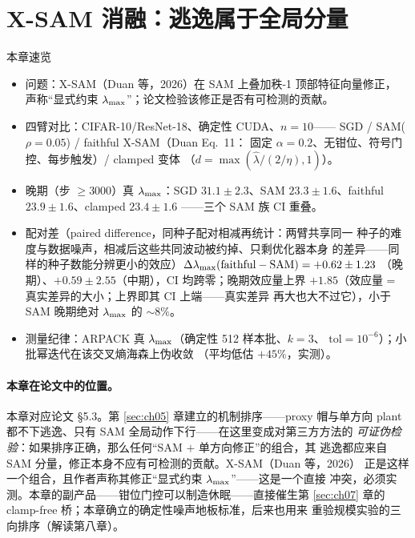 
\section{X-SAM 消融：逃逸属于全局分量}
\label{sec:ch06}

\begin{keybox}{本章速览}
\begin{itemize}
  \item 问题：X-SAM（Duan 等，2026）在 SAM 上叠加秩-1 顶部特征向量修正，
        声称``显式约束 $\lambda_{\max}$''；论文检验该修正是否有可检测的贡献。
  \item 四臂对比：CIFAR-10/ResNet-18、确定性 CUDA、$n{=}10$——
        SGD / SAM($\rho{=}0.05$) / faithful X-SAM（Duan Eq.~11：
        固定 $\alpha{=}0.2$、无钳位、符号门控、每步触发）/ clamped 变体
        （$d=\max(\hat\lambda/(2/\eta),1)$）。
  \item 晚期（步 $\geq3000$）真 $\lambda_{\max}$：SGD $31.1\pm2.3$、SAM
        $23.3\pm1.6$、faithful $23.9\pm1.6$、clamped $23.4\pm1.6$
        ——三个 SAM 族 CI 重叠。
  \item 配对差（paired difference，同种子配对相减再统计：两臂共享同一
        种子的难度与数据噪声，相减后这些共同波动被约掉、只剩优化器本身
        的差异——同样的种子数能分辨更小的效应）$\Delta\lambda_{\max}(\text{faithful}-\text{SAM})=+0.62\pm1.23$
        （晚期）、$+0.59\pm2.55$（中期），CI 均跨零；晚期效应量上界
        $+1.85$（效应量 = 真实差异的大小；上界即其 CI 上端——真实差异
        再大也大不过它），小于 SAM 晚期绝对 $\lambda_{\max}$ 的 $\sim8\%$。
  \item 测量纪律：ARPACK 真 $\lambda_{\max}$（确定性 512 样本批、$k{=}3$、
        $\mathrm{tol}{=}10^{-6}$）；小批幂迭代在该交叉熵海森上伪收敛
        （平均低估 $+45\%$，实测）。
\end{itemize}
\end{keybox}

\paragraph{本章在论文中的位置。}
本章对应论文 §5.3。第 \ref{sec:ch05} 章建立的机制排序——proxy 帽与单方向
plant 都不下逃逸、只有 SAM 全局动作下行——在这里变成对第三方方法的
\emph{可证伪检验}：如果排序正确，那么任何``SAM $+$ 单方向修正''的组合，其
逃逸都应来自 SAM 分量，修正本身不应有可检测的贡献。X-SAM（Duan 等，2026）
正是这样一个组合，且作者声称其修正``显式约束 $\lambda_{\max}$''——这是一个直接
冲突，必须实测。本章的副产品——钳位门控可以制造休眠——直接催生第
\ref{sec:ch07} 章的 clamp-free 桥；本章确立的确定性噪声地板标准，后来也用来
重验规模实验的三向排序（解读第八章）。

